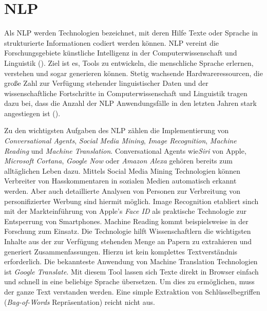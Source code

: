 \section{NLP}

Als \ac{NLP} werden Technologien bezeichnet, mit deren Hilfe Texte oder Sprache in strukturierte Informationen codiert werden können. \ac{NLP} vereint die Forschungsgebiete künstliche Intelligenz in der Computerwissenschaft und Linguistik (\cite[vgl.][1]{ITWISSEN}). Ziel ist es, Tools zu entwickeln, die menschliche Sprache erlernen, verstehen und sogar generieren können. Stetig wachsende Hardwareressourcen, die große Zahl zur Verfügung stehender linguistischer Daten und der wissenschaftliche Fortschritte in Computerwissenschaft und Linguistik tragen dazu bei, dass die Anzahl der \ac{NLP} Anwendungsfälle in den letzten Jahren stark angestiegen ist (\cite[vgl.][1]{HIRSCHBERG}). 
\par
Zu den wichtigsten Aufgaben des \ac{NLP} zählen die Implementierung von \textit{Conversational Agents}, \textit{Social Media Mining}, \textit{Image Recognition}, \textit{Machine Reading} und \textit{Machine Translation}. Conversational Agents wie\textit{Siri} von Apple, \textit{Microsoft Cortana}, \textit{Google Now} oder \textit{Amazon Alexa} gehören bereits zum alltäglichen Leben dazu. Mittels Social Media Mining Technologien können Verbreiter von Hasskommentaren in sozialen Medien automatisch erkannt werden. Aber auch detaillierte Analysen von Personen zur Verbreitung von personifizierter Werbung sind hiermit möglich. Image Recognition etabliert sinch mit der Markteinführung von Apple's \textit{Face ID} als praktische Technologie zur Entsperrung von Smartphones. Machine Reading kommt beispielsweise in der Forschung zum Einsatz. Die Technologie hilft Wissenschaftlern die wichtigsten Inhalte aus der zur Verfügung stehenden Menge an Papern zu extrahieren und generiert Zusammenfassungen. Hierzu ist kein komplettes Textverständnis erforderlich. Die bekannteste Anwendung  von Machine Translation Technologien ist \textit{Google Translate}. Mit diesem Tool lassen sich Texte direkt in Browser einfach und schnell in eine beliebige Sprache übersetzen. Um dies zu ermöglichen, muss der ganze Text verstanden werden. Eine simple Extraktion von Schlüsselbegriffen (\textit{Bag-of-Words} Repräsentation) reicht nicht aus.
